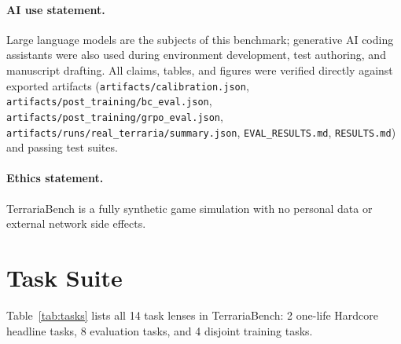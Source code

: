 \documentclass[10pt,letterpaper]{article}
\begin{document}
\paragraph{AI use statement.} Large language models are the subjects of this benchmark; generative AI coding assistants were also used during environment development, test authoring, and manuscript drafting. All claims, tables, and figures were verified directly against exported artifacts (\texttt{artifacts/calibration.json}, \texttt{artifacts/post\_training/bc\_eval.json}, \texttt{artifacts/post\_training/grpo\_eval.json}, \texttt{artifacts/runs/real\_terraria/summary.json}, \texttt{EVAL\_RESULTS.md}, \texttt{RESULTS.md}) and passing test suites.

\paragraph{Ethics statement.} TerrariaBench is a fully synthetic game simulation with no personal data or external network side effects.



\clearpage
\appendix
\section{Task Suite}
\label{app:tasks}

Table~\ref{tab:tasks} lists all 14 task lenses in TerrariaBench: 2 one-life Hardcore headline tasks, 8 evaluation tasks, and 4 disjoint training tasks.
\end{document}
